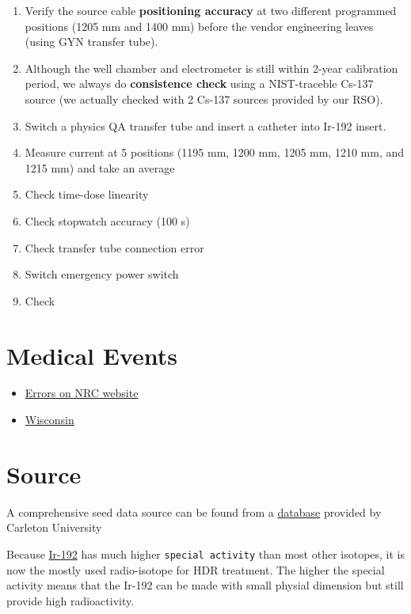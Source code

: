\documentclass[]{book}
\providecommand{\tightlist}{%
  \setlength{\itemsep}{0pt}\setlength{\parskip}{0pt}}
\theoremstyle{definition}
\theoremstyle{definition}
\theoremstyle{definition}
\theoremstyle{remark}
\begin{document}
\begin{enumerate}
\def\labelenumi{\arabic{enumi}.}
\tightlist
\item
  Verify the source cable \textbf{positioning accuracy} at two different
  programmed positions (1205 mm and 1400 mm) before the vendor
  engineering leaves (using GYN transfer tube).
\item
  Although the well chamber and electrometer is still within 2-year
  calibration period, we always do \textbf{consistence check} using a
  NIST-traceble Cs-137 source (we actually checked with 2 Cs-137 sources
  provided by our RSO).
\item
  Switch a physics QA transfer tube and insert a catheter into Ir-192
  insert.
\item
  Measure current at 5 positions (1195 mm, 1200 mm, 1205 mm, 1210 mm,
  and 1215 mm) and take an average
\item
  Check time-dose linearity
\item
  Check stopwatch accuracy (100 s)
\item
  Check transfer tube connection error
\item
  Switch emergency power switch
\item
  Check
\end{enumerate}

\section{Medical Events}\label{medical-events}

\begin{itemize}
\tightlist
\item
  \href{http://www.nrc.gov/reading-rm/doccollections/nuregs/brochures/br0117/}{Errors
  on NRC website}
\item
  \href{(http://chapter.aapm.org/GLC/media/2011/tollenaar.pdf)}{Wisconsin}
\end{itemize}

\section{Source}\label{source}

A comprehensive seed data source can be found from a
\href{http://www.physics.carleton.ca/clrp/seed_database}{database}
provided by Carleton University

Because
\href{https://www.estro.org/about/governance-organisation/committees-activities/tg43-ir-192-hdr}{Ir-192}
has much higher \texttt{special\ activity} than most other isotopes, it
is now the mostly used radio-isotope for HDR treatment. The higher the
special activity means that the Ir-192 can be made with small physial
dimension but still provide high radioactivity.
\end{document}
